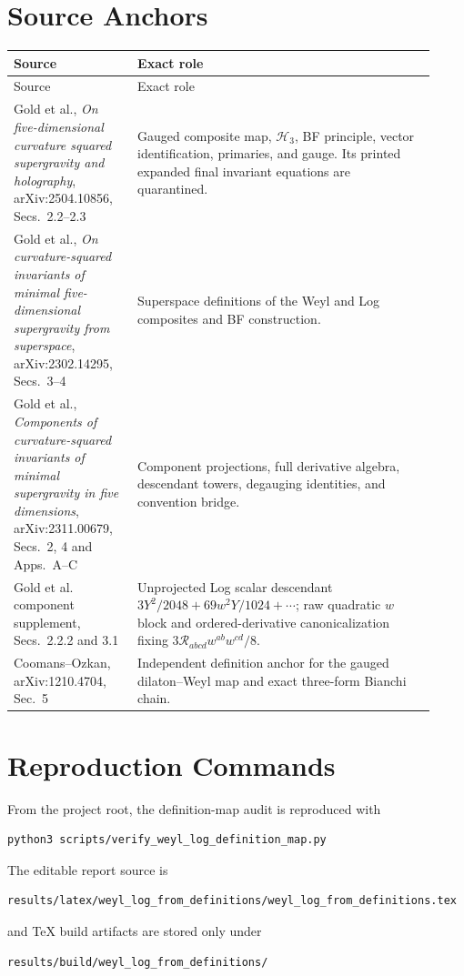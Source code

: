 \documentclass[11pt]{article}
\newcommand{\cR}{\mathcal R}
\begin{document}
\section{Source Anchors}

\begin{longtable}{>{\raggedright\arraybackslash}p{0.27\linewidth}>{\raggedright\arraybackslash}p{0.65\linewidth}}
\toprule
Source & Exact role\\
\midrule
\endfirsthead
\toprule Source & Exact role\\ \midrule
\endhead
Gold et al., \emph{On five-dimensional curvature squared supergravity and
holography}, arXiv:2504.10856, Secs.~2.2--2.3 & Gauged composite map,
$\mathcal H_3$, BF principle, vector identification, primaries, and gauge.
Its printed expanded final invariant equations are quarantined.\\
Gold et al., \emph{On curvature-squared invariants of minimal
five-dimensional supergravity from superspace}, arXiv:2302.14295, Secs.~3--4
& Superspace definitions of the Weyl and Log composites and BF construction.\\
Gold et al., \emph{Components of curvature-squared invariants of minimal
supergravity in five dimensions}, arXiv:2311.00679, Secs.~2, 4 and
Apps.~A--C & Component projections, full derivative algebra, descendant
towers, degauging identities, and convention bridge.\\
Gold et al. component supplement, Secs.~2.2.2 and 3.1 & Unprojected Log
scalar descendant $3Y^2/2048+69w^2Y/1024+\cdots$; raw quadratic $w$ block
and ordered-derivative canonicalization fixing
$3\cR_{abcd}w^{ab}w^{cd}/8$.\\
Coomans--Ozkan, arXiv:1210.4704, Sec.~5 & Independent definition anchor for
the gauged dilaton--Weyl map and exact three-form Bianchi chain.\\
\bottomrule
\end{longtable}

\section{Reproduction Commands}

From the project root, the definition-map audit is reproduced with
\begin{verbatim}
python3 scripts/verify_weyl_log_definition_map.py
\end{verbatim}
The editable report source is
\begin{verbatim}
results/latex/weyl_log_from_definitions/weyl_log_from_definitions.tex
\end{verbatim}
and TeX build artifacts are stored only under
\begin{verbatim}
results/build/weyl_log_from_definitions/
\end{verbatim}
\end{document}
